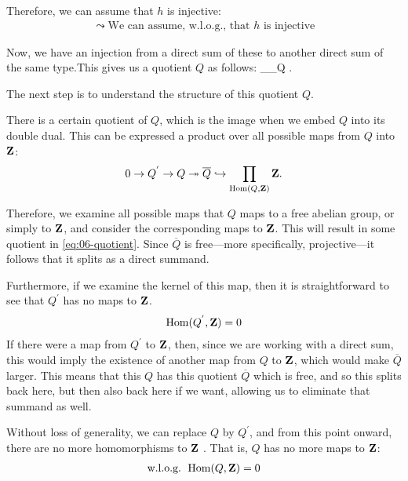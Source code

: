 Therefore, we can assume that $h$ is injective:
\begin{align*}
\leadsto \text{We can assume, w.l.o.g., that $h$ is injective}
\end{align*}

Now, we have an injection from a direct sum of these to another direct sum of the same type.This gives us a quotient $Q$ as follows: 
 \to \bigoplus_\N \Z \hookrightarrow \bigoplus_\N \Z \to Q . %
\ee

The next step is to understand the structure of this quotient $Q$.


There is a certain quotient of $Q$, which is the image when we embed $Q$ into its double dual. This can be expressed a product over all possible maps from $Q$ into $\mathbf Z$: 
\begin{align*} \label{eq:06-quotient}
0 \to Q^{'} \to Q \twoheadrightarrow \overline{Q} \hookrightarrow \prod_{\operatorname{Hom}(Q,\mathbf Z)} \mathbf Z.
\end{align*}

Therefore, we examine all possible maps that $Q$ maps to a free abelian group, or simply to $\mathbf Z$, and consider the corresponding maps to $\mathbf Z$. 
This will result in some quotient in \ref{eq:06-quotient}. Since $\overline{Q}$ is free---more specifically, projective---it follows that it splits as a direct summand.

Furthermore, if we examine the kernel of this map, then it is straightforward to see that $Q^{'}$ has no maps to $\mathbf Z$.
\begin{align*}
\operatorname{Hom}(Q^{'},\mathbf Z) = 0
\end{align*}
If there were a map from $Q^{'}$ to $\mathbf Z$, then, since we are working with a direct sum, this would imply the existence of another map from $Q$ to $\mathbf Z$, which would make $\overline{Q}$ larger. 
This means that this $Q$ has this quotient $\overline{Q}$ which is free, and so this splits back here, but then also back here if we want, allowing us to eliminate that summand as well.


Without loss of generality, we can replace $Q$ by $Q^{'}$, and from this point onward, there are no more homomorphisms to $\mathbf Z$ . That is, $Q$ has no more maps to $\mathbf Z$:
\begin{align*}
\text{w.l.o.g. } \operatorname{Hom}(Q,\mathbf Z) = 0
\end{align*}

